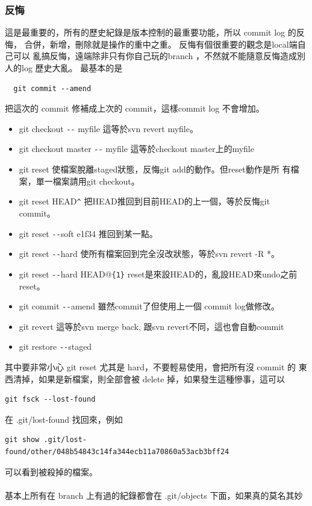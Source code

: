   \subsubsection{反悔}
  這是最重要的，所有的歷史紀錄是版本控制的最重要功能，所以 commit log 的反悔，
  合併，新增，刪除就是操作的重中之重。 反悔有個很重要的觀念是local端自己可以
  亂搞反悔，遠端除非只有你自己玩的branch ，不然就不能隨意反悔造成別人的log
  歷史大亂。 最基本的是
  \begin{verbatim}
  git commit --amend
  \end{verbatim}
  把這次的 commit 修補成上次的 commit，這樣commit log 不會增加。
  \begin{itemize}
    \item git checkout \verb=--= myfile 這等於svn revert myfile。
    \item git checkout master \verb=--= myfile 這等於checkout master上的myfile
    \item git reset 使檔案脫離staged狀態，反悔git add的動作。但reset動作是所
      有檔案，單一檔案請用git checkout。
    \item git reset HEAD\verb=^= 把HEAD推回到目前HEAD的上一個，等於反悔git commit。
    \item git reset \verb=--=soft e1f34 推回到某一點。
    \item git reset \verb=--=hard 使所有檔案回到完全沒改狀態，等於svn revert -R *。
    \item git reset \verb=--=hard HEAD@\verb={1}= reset是來設HEAD的，亂設HEAD來undo之前reset。
    \item git commit \verb=--=amend 雖然commit了但使用上一個 commit log做修改。
    \item git revert 這等於svn merge back, 跟svn revert不同，這也會自動commit
    \item git restore \verb=--=staged
  \end{itemize}
  其中要非常小心 git reset 尤其是 hard，不要輕易使用，會把所有沒 commit 的
  東西清掉，如果是新檔案，則全部會被 delete 掉，如果發生這種慘事，這可以
  \begin{verbatim}
git fsck --lost-found
  \end{verbatim}
  在 .git/lost-found 找回來，例如
  \begin{verbatim}
git show .git/lost-found/other/048b54843c14fa344ecb11a70860a53acb3bff24
  \end{verbatim}
  可以看到被殺掉的檔案。
  \\\\
  基本上所有在 branch 上有過的紀錄都會在 .git/objects 下面，如果真的莫名其妙
